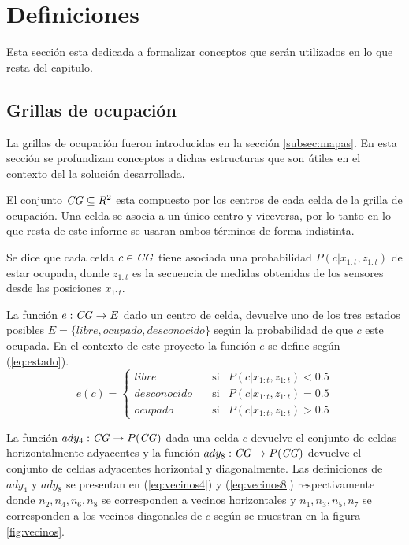 \section{Definiciones} \label{sec:def}
Esta sección esta dedicada a formalizar conceptos que serán utilizados en lo
que resta del capitulo.

\subsection{Grillas de ocupación}\label{subsec:Grilla}
La grillas de ocupación fueron introducidas en la sección \ref{subsec:mapas}.
En esta sección se profundizan conceptos a dichas estructuras que son útiles en
el contexto del la solución desarrollada.

El conjunto $\mathit{CG}\subseteq R^2$ esta compuesto por los centros de cada
celda de la grilla de ocupación. Una celda se asocia a un único centro y
viceversa, por lo tanto en lo que resta de este informe se usaran ambos
términos de forma indistinta.

Se dice que cada celda $c\in \mathit{CG}$ tiene asociada una probabilidad $P(c|x_{1:t},z_{1:t})$
de estar ocupada, donde $z_{1:t}$ es la secuencia de medidas obtenidas de los
sensores desde las posiciones $x_{1:t}$.

La función $e : \mathit{CG} \rightarrow E$ dado un centro de celda, devuelve uno
de los tres estados posibles $E=\{libre, ocupado, desconocido\}$ según la
probabilidad de que $c$ este ocupada. En el contexto de este proyecto la
función $e$ se define según
(\ref{eq:estado}).
\begin{equation} 
  e(c)= 
  \left \{ 
    \begin{aligned}
       libre       &\ \ \ \text{ si}& P(c|x_{1:t},z_{1:t}) < 0.5 \\
       desconocido &\ \ \ \text{ si}& P(c|x_{1:t},z_{1:t}) = 0.5 \\
       ocupado     &\ \ \ \text{ si}& P(c|x_{1:t},z_{1:t}) > 0.5
    \end{aligned}
  \right .
  \label{eq:estado}
\end{equation}

La función $ady_4 : \mathit{CG} \rightarrow P(\mathit{CG})$ dada una celda $c$ devuelve el conjunto
de celdas horizontalmente adyacentes y la función $ady_8 : \mathit{CG} \rightarrow P(\mathit{CG})$
devuelve el conjunto de celdas adyacentes horizontal y diagonalmente. Las
definiciones de $ady_4$ y $ady_8$ se presentan en (\ref{eq:vecinos4}) y
(\ref{eq:vecinos8}) respectivamente donde $n_2, n_4, n_6, n_8$ se corresponden
a vecinos horizontales y $n_1, n_3, n_5, n_7$ se corresponden a los vecinos
diagonales de $c$ según se muestran en la figura \ref{fig:vecinos}.

